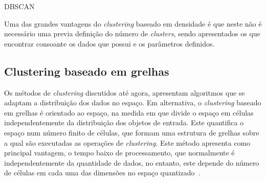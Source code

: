 \begin{algorithm}[ht]
\caption{DBSCAN}\label{dbscan}
\begin{algorithmic}[1]
	\Repeat
					\EndIf
				\EndIf
				\EndIf
			\EndFor
		\EndIf
\EndProcedure 
\end{algorithmic}
\end{algorithm}

Uma das grandes vantagens do \textit{clustering} baseado em densidade é que neste não é necessário uma previa definição do número de \textit{clusters}, sendo apresentados os que encontrar consoante os dados que possui e os parâmetros definidos. 


\subsection{Clustering baseado em grelhas} %

Os métodos de \textit{clustering} discutidos até agora, apresentam algoritmos que se adaptam a distribuição dos dados no espaço. Em alternativa, o \textit{clustering} baseado em grelhas é orientado ao espaço, na medida em que divide o espaço em células independentemente da distribuição dos objetos de entrada. Este quantifica o espaço num número finito de células, que formam uma estrutura de grelhas sobre a qual são executadas as operações de \textit{clustering}. Este método apresenta como principal vantagem, o tempo baixo de processamento, que normalmente é independentemente da quantidade de dados, no entanto, este depende do número de células em cada uma das dimensões no espaço quantizado~\cite{Han2006}.

